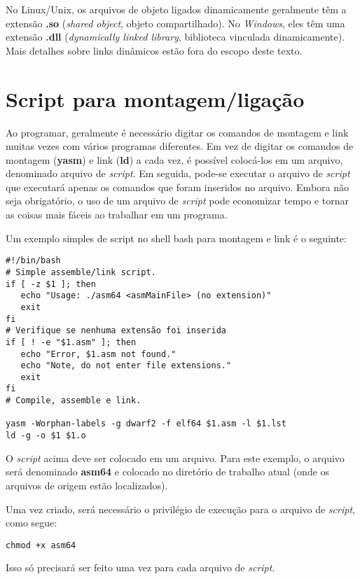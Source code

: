 No Linux/Unix, os arquivos de objeto ligados dinamicamente geralmente têm a extensão \textbf{.so} (\textit{shared object}, objeto compartilhado). No \textit{Windows}, eles têm uma extensão \textbf{.dll} (\textit{dynamically linked library}, biblioteca vinculada dinamicamente). Mais detalhes sobre links dinâmicos estão fora do escopo deste texto.

\section{Script para montagem/ligação}
Ao programar, geralmente é necessário digitar os comandos de montagem e link muitas vezes com vários programas diferentes. Em vez de digitar os comandos de montagem (\textbf{yasm}) e link (\textbf{ld}) a cada vez, é possível colocá-los em um arquivo, denominado arquivo de \textit{script}. Em seguida, pode-se executar o arquivo de \textit{script} que executará apenas os comandos que foram inseridos no arquivo. Embora não seja obrigatório, o uso de um arquivo de \textit{script} pode economizar tempo e tornar as coisas mais fáceis ao trabalhar em um programa.

Um exemplo simples de script no shell bash para montagem e link é o seguinte:
\begin{verbatim}
#!/bin/bash
# Simple assemble/link script.
if [ -z $1 ]; then
   echo "Usage: ./asm64 <asmMainFile> (no extension)"
   exit
fi
# Verifique se nenhuma extensão foi inserida
if [ ! -e "$1.asm" ]; then
   echo "Error, $1.asm not found."
   echo "Note, do not enter file extensions."
   exit
fi
# Compile, assemble e link.

yasm -Worphan-labels -g dwarf2 -f elf64 $1.asm -l $1.lst
ld -g -o $1 $1.o
\end{verbatim}

O \textit{script} acima deve ser colocado em um arquivo. Para este exemplo, o arquivo será denominado \textbf{asm64} e colocado no diretório de trabalho atual (onde os arquivos de origem estão localizados).

Uma vez criado, será necessário o privilégio de execução para o arquivo de \textit{script}, como segue:
\begin{center}
	\begin{verbatim}
chmod +x asm64
\end{verbatim}
\end{center}

Isso só precisará ser feito uma vez para cada arquivo de \textit{script}.

